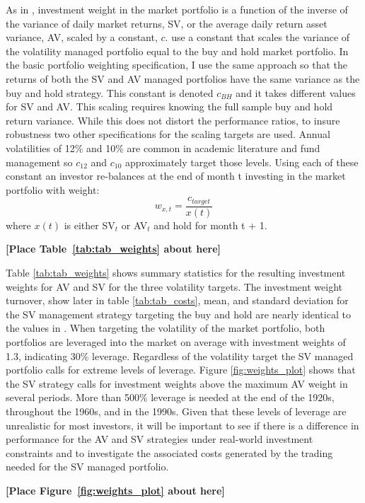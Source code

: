 As in \citet{moreira_volatility-managed_2017}, investment weight in the market portfolio is a function of the inverse of the variance of daily market returns, SV, or the average daily return asset variance, AV, scaled by a constant, $c$. \citet{moreira_volatility-managed_2017} use a constant that scales the variance of the volatility managed portfolio equal to the buy and hold market portfolio. In the basic portfolio weighting specification, I use the same approach so that the returns of both the SV and AV managed portfolios have the same variance as the buy and hold strategy. This constant is denoted $c_{BH}$ and it takes different values for SV and AV. This scaling requires knowing the full sample buy and hold return variance. While this does not distort the performance ratios, to insure robustness two other specifications for the scaling targets are used. Annual volatilities of 12\% and 10\% are common in academic literature and fund management so $c_{12}$ and $c_{10}$ approximately target those levels. \citep{barroso_momentum_2015,morrison_guarantees_nodate,verma_volatility-targeting_2018,fleming_economic_nodate,hocquard_constant-volatility_2013} Using each of these constant an investor re-balances at the end of month t investing in the market portfolio with weight:
\begin{equation}
	w_{x,t} = \frac{c_{target}}{x(t)}
\end{equation} where $x(t)$ is either SV$_{t}$ or AV$_{t}$ and hold for month t + 1. 

\bigskip
\centerline{\bf [Place Table~\ref{tab:tab_weights} about here]}
\bigskip
Table \ref{tab:tab_weights} shows summary statistics for the resulting investment weights for AV and SV for the three volatility targets. The investment weight turnover, show later in table \ref{tab:tab_costs}, mean, and standard deviation for the SV management strategy targeting the buy and hold are nearly identical to the values in \citet{moreira_volatility-managed_2017}. When targeting the volatility of the market portfolio, both portfolios are leveraged into the market on average with investment weights of 1.3, indicating 30\% leverage. Regardless of the volatility target the SV managed portfolio calls for extreme levels of leverage. Figure \ref{fig:weights_plot} shows that the SV strategy calls for investment weights above the maximum AV weight in several periods. More than 500\% leverage is needed at the end of the 1920s, throughout the 1960s, and in the 1990s. Given that these levels of leverage are unrealistic for most investors, it will be important to see if there is a difference in performance for the AV and SV strategies under real-world investment constraints and to investigate the associated costs generated by the trading needed for the SV managed portfolio.
\bigskip
\centerline{\bf [Place Figure~\ref{fig:weights_plot} about here]}
\bigskip
